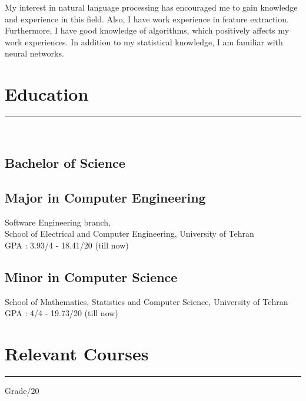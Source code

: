 \documentclass[]{rahulworld-resume}
\begin{document}
\begin{minipage}[t]{0.35\textwidth} 
	My interest in natural language processing has encouraged me to gain knowledge and experience in this field. Also, I have work experience in feature extraction. Furthermore, I have good knowledge of algorithms, which positively affects my work experiences. In addition to my statistical knowledge, I am familiar with neural networks.
\section{Education} 
\noindent\rule{5cm}{0.4pt}\\
\subsection{Bachelor of Science}
\vspace{5pt}
\subsection{Major in Computer Engineering}
Software Engineering branch,\\
School of Electrical and Computer Engineering,
University of Tehran\\
GPA : 3.93/4 - 18.41/20 (till now)\\
\vspace{5pt}
\subsection{Minor in Computer Science}
School of Mathematics, Statistics and Computer Science,
University of Tehran\\
GPA : 4/4 - 19.73/20 (till now)\\

\section{Relevant Courses\\\vspace{-12pt}{\normalsize\normalfont (*: Graduate Course)}\vspace{-10pt}}
\noindent\rule{5cm}{0.4pt}\hfill Grade/20


\end{minipage}
\end{document}
